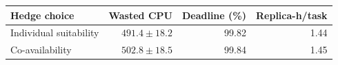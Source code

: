 \begin{tabular}{@{}lrrr@{}}
\toprule
Hedge choice & Wasted CPU & Deadline (\%) & Replica-h/task \\
\midrule
Individual suitability & $491.4 \pm 18.2$ & 99.82 & 1.44 \\
Co-availability & $502.8 \pm 18.5$ & 99.84 & 1.45 \\
\bottomrule
\end{tabular}
